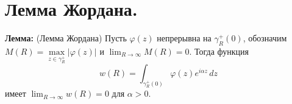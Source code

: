 \section{Лемма
Жордана.}\label{ux43bux435ux43cux43cux430-ux436ux43eux440ux434ux430ux43dux430.}

\textbf{Лемма:} (Лемма Жордана) Пусть \(\varphi(z)\) непрерывна на
\(\gamma_{R}^{+}(0)\), обозначим
\(M(R)=\max\limits_{z\in\gamma_{R}^{+}}|\varphi(z)|\) и
\(\lim_{ R \to \infty }M(R)=0\). Тогда функция \[
w(R)=\int_{\gamma_{R}^{+}(0)}\varphi(z)e^{ i\alpha z }\,dz
\] имеет \(\lim_{ R \to \infty }w(R)=0\) для \(\alpha>0\).
